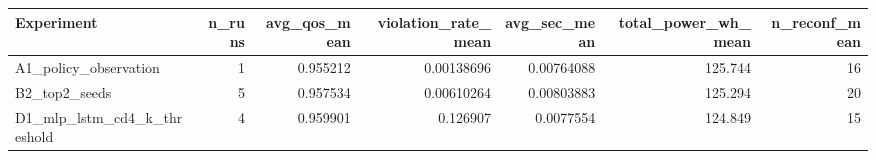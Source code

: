 \begin{tabular}{lrrrrrr}
\toprule
Experiment & n_runs & avg_qos_mean & violation_rate_mean & avg_sec_mean & total_power_wh_mean & n_reconf_mean \\
\midrule
A1_policy_observation & 1 & 0.955212 & 0.00138696 & 0.00764088 & 125.744 & 16 \\
B2_top2_seeds & 5 & 0.957534 & 0.00610264 & 0.00803883 & 125.294 & 20 \\
D1_mlp_lstm_cd4_k_threshold & 4 & 0.959901 & 0.126907 & 0.0077554 & 124.849 & 15 \\
\bottomrule
\end{tabular}
